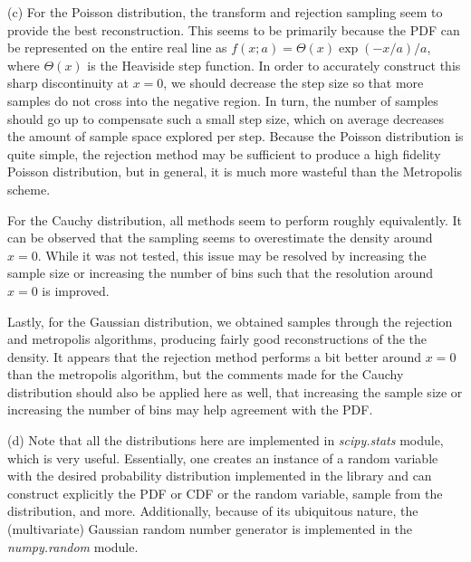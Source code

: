 {(c) For the Poisson distribution, the transform and rejection sampling seem to provide the best reconstruction.
This seems to be primarily because the PDF can be represented on the entire real line as $f(x;a) = \Theta(x) \exp(-x/a)/a$, where $\Theta(x)$ is the Heaviside step function.
In order to accurately construct this sharp discontinuity at $x = 0$, we should decrease the step size so that more samples do not cross into the negative region.
In turn, the number of samples should go up to compensate such a small step size, which on average decreases the amount of sample space explored per step.
Because the Poisson distribution is quite simple, the rejection method may be sufficient to produce a high fidelity Poisson distribution, but in general, it is much more wasteful than the Metropolis scheme.

For the Cauchy distribution, all methods seem to perform roughly equivalently.
It can be observed that the sampling seems to overestimate the density around $x = 0$.
While it was not tested, this issue may be resolved by increasing the sample size or increasing the number of bins such that the resolution around $x = 0$ is improved.

Lastly, for the Gaussian distribution, we obtained samples through the rejection and metropolis algorithms, producing fairly good reconstructions of the the density.
It appears that the rejection method performs a bit better around $x = 0$ than the metropolis algorithm, but the comments made for the Cauchy distribution should also be applied here as well, that increasing the sample size or increasing the number of bins may help agreement with the PDF.

(d) Note that all the distributions here are implemented in \textit{scipy.stats} module, which is very useful.
Essentially, one creates an instance of a random variable with the desired probability distribution implemented in the library and can construct explicitly the PDF or CDF or the random variable, sample from the distribution, and more.
Additionally, because of its ubiquitous nature, the (multivariate) Gaussian random number generator is implemented in the \textit{numpy.random} module.


}



